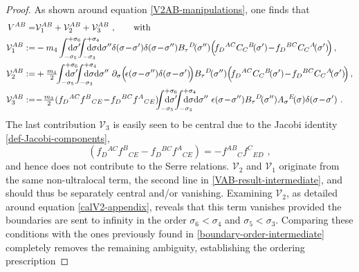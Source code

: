 \documentclass[12pt]{article}
\numberwithin{equation}{section}
\begin{document}
\begin{proof}
As shown around equation \eqref{V2AB-manipulations}, one finds that
\begin{align}\label{VAB-contributions}
V^{AB}=&\mathcal{V}_{1}^{AB}+\mathcal{V}_{2}^{AB}+\mathcal{V}_{3}^{AB} \,\,,
\qquad \text{with} \qquad 
\\
\mathcal{V}_{1}^{AB}:=&-m_{4}\int_{-\sigma_{5}}^{+\sigma_{6}}\!\!\!\!\!\!\!\!\!\!\mathrm{d}\sigma' \!\!\! \int_{-\sigma_{3}}^{+\sigma_{4}}\!\!\!\!\!\!\!\!\!\!\mathrm{d}\sigma\mathrm{d}\sigma''  \delta(\sigma\!-\!\sigma')\delta(\sigma\!-\!\sigma'')B_{\tau}{}^{D}\!(\sigma'')\Bigl(\!f_{D}{}^{AC}C_{C}{}^{B}\!(\sigma')\!-\!f_{D}{}^{BC}C_{C}{}^{A}\!(\sigma')\!\Bigr) \, ,
\notag \\
\mathcal{V}_{2}^{AB}:=&+\tfrac{m_{4}}{2} \!\! \int_{-\sigma_{5}}^{+\sigma_{6}}\!\!\!\!\!\!\!\!\!\!\mathrm{d}\sigma' \!\!\! \int_{-\sigma_{3}}^{+\sigma_{4}}\!\!\!\!\!\!\!\!\!\!\mathrm{d}\sigma\mathrm{d}\sigma'' \,\,  \partial_{\sigma}\Bigl(\!\epsilon(\sigma\!-\!\sigma'')\delta(\sigma\!-\!\sigma')\!\Bigr)B_{\tau}{}^{D}\!(\sigma'')\Bigl(\!f_{D}{}^{AC}C_{C}{}^{B}\!(\sigma')\!-\!f_{D}{}^{BC}C_{C}{}^{A}\!(\sigma')\!\Bigr) \, ,
\notag \\
\mathcal{V}_{3}^{AB}:=&\!-\!\tfrac{m_{3}}{2}(f_{D}{}^{AC}f^{B}{}_{CE}\!-\!f_{D}{}^{BC}f^{A}{}_{CE})\!\!\!\int_{-\sigma_{5}}^{+\sigma_{6}}\!\!\!\!\!\!\!\!\!\!\mathrm{d}\sigma' \!\!\! \int_{-\sigma_{3}}^{+\sigma_{4}}\!\!\!\!\!\!\!\!\!\!\mathrm{d}\sigma\mathrm{d}\sigma''  \,\, \epsilon(\sigma\!-\!\sigma'')B_{\tau}{}^{D}\!(\sigma'')A_{\sigma}{}^{E}\!(\sigma)\delta(\sigma\!-\!\sigma') \,\, .
\notag 
\end{align}
The last contribution $\mathcal{V}_{3}$ is easily seen to be central due to the Jacobi identity \eqref{def-Jacobi-components},
\begin{equation}\label{VAB-first-line-Jacobi}
(f_{D}{}^{AC}f^{B}{}_{CE}\!-\!f_{D}{}^{BC}f^{A}{}_{CE})=-f^{AB}{}_{C}f^{C}{}_{ED} \,\, ,
\end{equation}
and hence does not contribute to the Serre relations. $\mathcal{V}_{2}$ and $\mathcal{V}_{1}$ originate from the same non-ultralocal term, the second line in \eqref{VAB-result-intermediate}, and should thus be separately central and/or vanishing. Examining $\mathcal{V}_{2}$, as detailed around equation \eqref{calV2-appendix}, reveals that this term vanishes provided the boundaries are sent to infinity in the order $\sigma_{6}<\sigma_{4}$ and $\sigma_{5}<\sigma_{3}$. Comparing these conditions with the ones previously found in \eqref{boundary-order-intermediate} completely removes the remaining ambiguity, establishing the ordering prescription

\end{proof}
\end{document}
